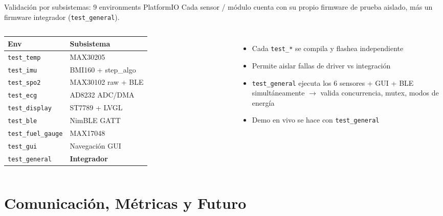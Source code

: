 \documentclass[aspectratio=169, 10pt]{beamer}
\begin{document}
\begin{frame}{Validaci\'on por subsistemas: 9 environments PlatformIO}
    \footnotesize
    Cada sensor / m\'odulo cuenta con su propio firmware de prueba aislado, m\'as un firmware integrador (\texttt{test\_general}).
    \vspace{0.2cm}
    \begin{columns}[T]
        \begin{tabular}{l l}
            \toprule
            \textbf{Env} & \textbf{Subsistema} \\
            \midrule
            \texttt{test\_temp}        & MAX30205 \\
            \texttt{test\_imu}         & BMI160 + step\_algo \\
            \texttt{test\_spo2}        & MAX30102 raw + BLE \\
            \texttt{test\_ecg}         & AD8232 ADC/DMA \\
            \texttt{test\_display}     & ST7789 + LVGL \\
            \texttt{test\_ble}         & NimBLE GATT \\
            \texttt{test\_fuel\_gauge} & MAX17048 \\
            \texttt{test\_gui}         & Navegaci\'on GUI \\
            \texttt{test\_general}     & \textbf{Integrador} \\
            \bottomrule
        \end{tabular}
        \begin{itemize}\itemsep0pt
            \item Cada \texttt{test\_*} se compila y flashea independiente
            \item Permite aislar fallas de driver vs integraci\'on
            \item \texttt{test\_general} ejecuta los 6 sensores + GUI + BLE simult\'aneamente $\rightarrow$ valida concurrencia, mutex, modos de energ\'ia
            \item Demo en vivo se hace con \texttt{test\_general}
        \end{itemize}
    \end{columns}
\end{frame}

\section{Comunicaci\'on, M\'etricas y Futuro}
\end{document}
